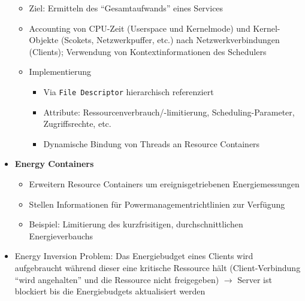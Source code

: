 \begin{itemize}
	\begin{itemize}
		\item Ziel: Ermitteln des "`Gesamtaufwands"' eines Services
		\item Accounting von CPU-Zeit (Userspace und Kernelmode) und Kernel-Objekte (Scokets, Netzwerkpuffer, etc.) nach Netzwerkverbindungen (Clients); Verwendung von Kontextinformationen des Schedulers
		\item Implementierung
		\begin{itemize}
			\item Via \texttt{File Descriptor} hierarchisch referenziert
			\item Attribute: Ressourcenverbrauch/-limitierung, Scheduling-Parameter, Zugriffsrechte, etc.
			\item Dynamische Bindung von Threads an Resource Containers
		\end{itemize}
	\end{itemize}
	\item \textbf{Energy Containers}
	\begin{itemize}
		\item Erweitern Resource Containers um ereignisgetriebenen Energiemessungen
		\item Stellen Informationen für Powermanagementrichtlinien zur Verfügung
		\item Beispiel: Limitierung des kurzfrisitigen, durchschnittlichen Energieverbauchs
	\end{itemize}
	\item Energy Inversion Problem: Das Energiebudget eines Clients wird aufgebraucht während dieser eine kritische Ressource hält (Client-Verbindung "`wird angehalten"' und die Ressource nicht freigegeben) \(\rightarrow\) Server ist blockiert bis die Energiebudgets aktualisiert werden
\end{itemize}



